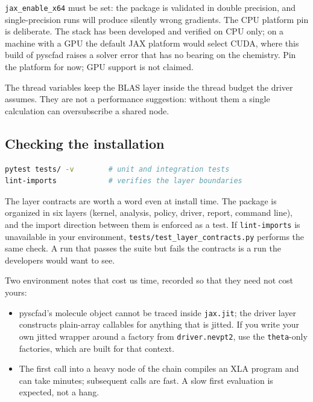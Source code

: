 \texttt{jax\_enable\_x64} must be set: the package is validated in
double precision, and single-precision runs will produce silently
wrong gradients.  The CPU platform pin is deliberate.  The stack has
been developed and verified on CPU only; on a machine with a GPU the
default JAX platform would select CUDA, where this build of pyscfad
raises a solver error that has no bearing on the chemistry.  Pin the
platform for now; GPU support is not claimed.

The thread variables keep the BLAS layer inside the thread budget the
driver assumes.  They are not a performance suggestion: without them a
single calculation can oversubscribe a shared node.

\subsection{Checking the installation}

\begin{lstlisting}[language=bash]
pytest tests/ -v        # unit and integration tests
lint-imports            # verifies the layer boundaries
\end{lstlisting}

The layer contracts are worth a word even at install time.  The package
is organized in six layers (kernel, analysis, policy, driver, report,
command line), and the import direction between them is enforced as a
test.  If \texttt{lint-imports} is unavailable in your environment,
\texttt{tests/\allowbreak test\_layer\_\allowbreak contracts.py} performs the same check.  A
run that passes the suite but fails the contracts is a run the
developers would want to see.

Two environment notes that cost us time, recorded so that they need
not cost yours:

\begin{itemize}
  \item pyscfad's molecule object cannot be traced inside
    \texttt{jax.jit}; the driver layer constructs plain-array callables
    for anything that is jitted.  If you write your own jitted wrapper
    around a factory from \texttt{driver.nevpt2}, use the
    \texttt{theta}-only factories, which are built for that context.
  \item The first call into a heavy node of the chain compiles an XLA
    program and can take minutes; subsequent calls are fast.  A slow
    first evaluation is expected, not a hang.
\end{itemize}
